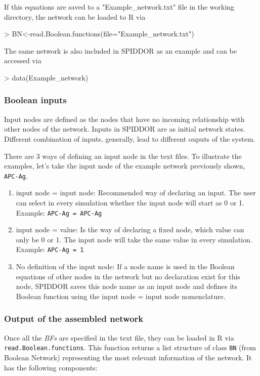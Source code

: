 \documentclass[a4paper]{article}
\begin{document}
If this equations are saved to a "Example\_network.txt" file in the working directory, the network can be loaded to R via
\begin{Schunk}
\begin{Sinput}
> BN<-read.Boolean.functions(file="Example_network.txt")
\end{Sinput}
\end{Schunk}

The same network is also included in SPIDDOR as an example and can be accessed via
\begin{Schunk}
\begin{Sinput}
> data(Example_network)
\end{Sinput}
\end{Schunk}
\subsubsection{Boolean inputs}
Input nodes are defined as the nodes that have no incoming relationship with other nodes of the network. Inputs in SPIDDOR are as initial network states. Different combination of inputs, generally, lead to different ouputs of the system.

There are 3 ways of defining an input node in the text files. To illustrate the examples, let's take the input node of the example network previously shown, \texttt{APC-Ag}.
\begin{enumerate}
  \item{input node = input node:}{ Recommended way of declaring an input. The user can select in every simulation whether the input node will start as  0 or 1. Example: \texttt{APC-Ag = APC-Ag}}
  \item{input node = value:}{ Is the way of declaring a fixed node, which value can only be 0 or 1. The input node will take the same value in every simulation. Example: \texttt{APC-Ag = 1}}
  \item{No definition of the input node:}{ If a node name is used in the Boolean equations of other nodes in the network but no declaration exist for this node, SPIDDOR saves this node name as an input node and defines its Boolean function using the input node = input node nomenclature.}
\end{enumerate}

\subsubsection{Output of the assembled network}
Once all the \emph{BFs} are specified in the text file, they can be loaded in R via \texttt{read.Boolean.functions}. This function returns a list structure of class \texttt{BN} (from Boolean Network) representing the most relevant information of the network. It has the following components:
\end{document}
